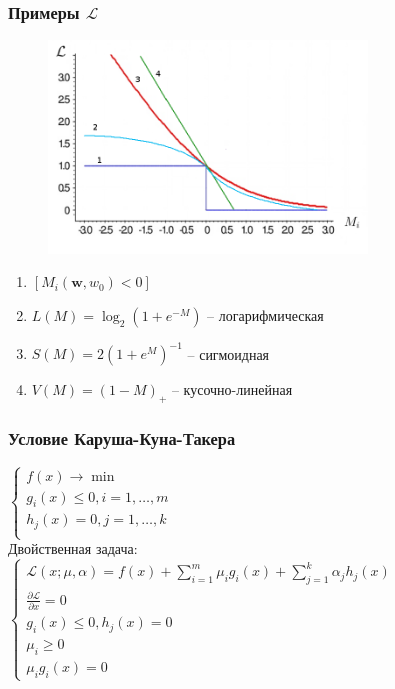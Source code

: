 \documentclass[12pt]{beamer}
\begin{document}
\begin{frame}\frametitle{Примеры $\mathcal{L}$}
\begin{figure}[htbp]
  \includegraphics[height=160pt, keepaspectratio = true]{images/l}
\end{figure}
\begin{enumerate}
\item $\left[M_i(\mathbf{w}, w_0) < 0 \right]$
\item $L(M) = \log_2(1+e^{-M})$ -- логарифмическая
\item $S(M) = 2(1+e^M)^{-1}$ -- сигмоидная
\item $V(M) = (1-M)_+$ -- кусочно-линейная
\end{enumerate}
\end{frame}

\begin{frame}\frametitle{Условие Каруша-Куна-Такера}
$\begin{cases}
f(x) \rightarrow \min\\
g_i(x) \leq 0 , i = 1, \dots, m\\
h_j(x) = 0 , j = 1, \dots, k\\
\end{cases}$\\
\vspace{5mm}
Двойственная задача:\\
$\begin{cases}
\mathcal{L}(x; \mu, \alpha) = f(x) + \sum\limits_{i = 1}^m \mu_ig_i(x) + \sum\limits_{j = 1}^k \alpha_jh_j(x)\\
\frac{\partial \mathcal{L}}{\partial x} = 0\\
g_i(x) \leq 0 , h_j(x) = 0\\
\mu_i \geq 0\\
\mu_ig_i(x) = 0
\end{cases}$\\

\end{frame}
\end{document}
